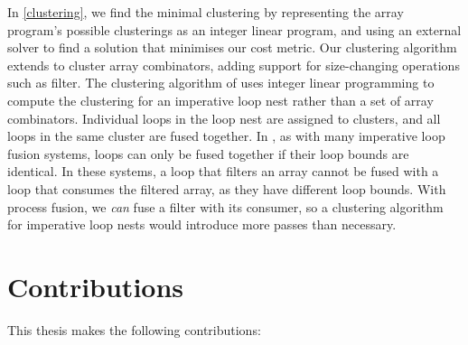 In \cref{clustering}, we find the minimal clustering by representing the array program's possible clusterings as an integer linear program, and using an external solver to find a solution that minimises our cost metric.
Our clustering algorithm extends \citet{megiddo1998optimal} to cluster array combinators, adding support for size-changing operations such as filter.
The clustering algorithm of \citet{megiddo1998optimal} uses integer linear programming to compute the clustering for an imperative loop nest rather than a set of array combinators.
Individual loops in the loop nest are assigned to clusters, and all loops in the same cluster are fused together.
In \citet{megiddo1998optimal}, as with many imperative loop fusion systems, loops can only be fused together if their loop bounds are identical.
In these systems, a loop that filters an array cannot be fused with a loop that consumes the filtered array, as they have different loop bounds.
With process fusion, we \emph{can} fuse a filter with its consumer, so a clustering algorithm for imperative loop nests would introduce more passes than necessary.

\section{Contributions}

This thesis makes the following contributions:

